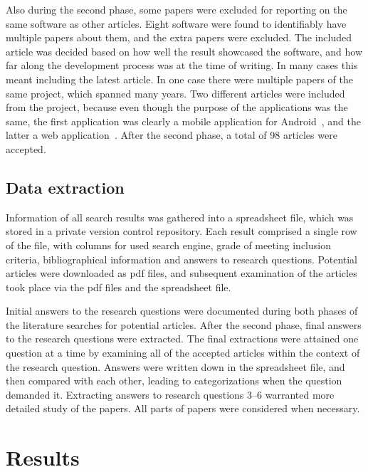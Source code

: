 \documentclass[utf8,english]{gradu3}
\begin{document}
Also during the second phase, some papers were excluded for reporting on the same software as other articles.
Eight software were found to identifiably have multiple papers about them, and the extra papers were excluded.
The included article was decided based on how well the result showcased the software, and how far along the
development process was at the time of writing. In many cases this meant including the latest article.
In one case there were multiple papers of the same project, which spanned many years.
Two different articles were included from the project, because even though the purpose of the applications was the same,
the first application was clearly a mobile application for Android~\parencite{artoni2013portable},
and the latter a web application~\parencite{artoni2018technology}.
After the second phase, a total of 98 articles were accepted.


\section{Data extraction}

Information of all search results was gathered into a spreadsheet file,
which was stored in a private version control repository.
Each result comprised a single row of the file, with columns for used search engine,
grade of meeting inclusion criteria, bibliographical information and answers to research questions.
Potential articles were downloaded as pdf files, and subsequent examination of the articles
took place via the pdf files and the spreadsheet file.

Initial answers to the research questions were documented during both phases of
the literature searches for potential articles.
After the second phase, final answers to the research questions were extracted.
The final extractions were attained one question at a time by examining all of the
accepted articles within the context of the research question.
Answers were written down in the spreadsheet file, and then compared with each other,
leading to categorizations when the question demanded it.
Extracting answers to research questions 3--6 warranted more detailed
study of the papers. All parts of papers were considered when necessary.


\chapter{Results} \label{results}
\end{document}
